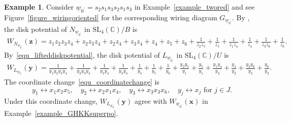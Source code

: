 \documentclass[11pt]{amsart}
\theoremstyle{plain}
\theoremstyle{definition}
\newtheorem{example}[theorem]{Example}
\theoremstyle{remark}
\newcommand{\C}{\mathbb{C}}
\numberwithin{equation}{section} \numberwithin{table}{section}
\numberwithin{equation}{section}
\begin{document}
\begin{example}
Consider $\underline{w}_{0^\prime} = s_2 s_1 s_3 s_2 s_1 s_3$ in Example~\ref{example_twored} and see Figure~\ref{figure_wiringoriented} for the corresponding wiring diagram $G_{\underline{w}_{0^\prime}}$. By \cite[Corollary 6.14]{CKLP23}, the disk potential of $N_{\underline{w}_{0^\prime}}$ in $\mathrm{SL}_4(\C)/B$ is
{\small
\begin{align*}
W_{N_{\underline{w}_{0^\prime}}}(\mathbf{z}) = z_1z_2z_3z_4 +z_2z_3z_4 + z_2z_4 + z_3z_4 + z_4 + z_5 + z_6 + \frac{1}{z_2 z_5} + \frac{1}{z_5} + \frac{1}{z_1z_4} + \frac{1}{z_4} + \frac{1}{z_3z_6} + \frac{1}{z_6} .
\end{align*}
}
By~\eqref{equ_lifteddiskpotential}, the disk potential of $L_{\underline{w}_{0^\prime}}$ in $\mathrm{SL}_4(\C)/U$ is 
{\small
\begin{align*}
W_{L_{\underline{w}_{0^\prime}}}(\mathbf{y}) = \frac{1}{y_1y_2y_3y_4} + \frac{1}{y_2y_3y_4} + \frac{1}{y_2y_4} + \frac{1}{y_3y_4} + \frac{1}{y_4} + \frac{1}{y_5} + \frac{1}{y_6} + \frac{y_2 y_5}{y_{\underline{1}}} + \frac{y_5}{y_{\underline{1}}} + \frac{y_1y_4}{y_{\underline{2}}} + \frac{y_4}{y_{\underline{2}}} + \frac{y_3y_6}{y_{\underline{3}}} + \frac{y_6}{y_{\underline{3}}}.
\end{align*}}
The coordinate change~\eqref{equ_coordinatechange} is 
$$
y_{\underline{1}} \leftrightarrow x_{\underline{1}}x_2x_5, \quad y_{\underline{2}} \leftrightarrow x_{\underline{2}}x_1x_4, \quad y_{\underline{3}} \leftrightarrow x_{\underline{3}}x_3x_6, \quad y_j \leftrightarrow x_j \mbox{ for $j \in J$}.
$$
Under this coordinate change,  $W_{L_{\underline{w}_{0^\prime}}}(\mathbf{y})$ agree with $W_{\underline{w}_{0^\prime}}(\mathbf{x})$ in Example~\ref{example_GHKKsuperpo}.
\end{example}
\end{document}

